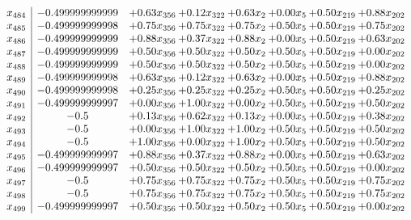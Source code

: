 \documentclass[8pt]{article}
\begin{document}
\[\begin{array}{c| c c@{\hskip 2pt} c@{\hskip 2pt} c@{\hskip 2pt} c@{\hskip 2pt} c@{\hskip 2pt} c@{\hskip 2pt} }
 x_{484}   &  -0.499999999999 & +  0.63 x_{356} & +  0.12 x_{322} & +  0.63 x_{2} & +  0.00 x_{5} & +  0.50 x_{219} & +  0.88 x_{202}\\
 x_{485}   &  -0.499999999998 & +  0.75 x_{356} & +  0.75 x_{322} & +  0.75 x_{2} & +  0.50 x_{5} & +  0.50 x_{219} & +  0.75 x_{202}\\
 x_{486}   &  -0.499999999999 & +  0.88 x_{356} & +  0.37 x_{322} & +  0.88 x_{2} & +  0.00 x_{5} & +  0.50 x_{219} & +  0.63 x_{202}\\
 x_{487}   &  -0.499999999999 & +  0.50 x_{356} & +  0.50 x_{322} & +  0.50 x_{2} & +  0.50 x_{5} & +  0.50 x_{219} & +  0.00 x_{202}\\
 x_{488}   &  -0.499999999999 & +  0.50 x_{356} & +  0.50 x_{322} & +  0.50 x_{2} & +  0.50 x_{5} & +  0.50 x_{219} & +  0.00 x_{202}\\
 x_{489}   &  -0.499999999998 & +  0.63 x_{356} & +  0.12 x_{322} & +  0.63 x_{2} & +  0.00 x_{5} & +  0.50 x_{219} & +  0.88 x_{202}\\
 x_{490}   &  -0.499999999998 & +  0.25 x_{356} & +  0.25 x_{322} & +  0.25 x_{2} & +  0.50 x_{5} & +  0.50 x_{219} & +  0.25 x_{202}\\
 x_{491}   &  -0.499999999997 & +  0.00 x_{356} & +  1.00 x_{322} & +  0.00 x_{2} & +  0.50 x_{5} & +  0.50 x_{219} & +  0.50 x_{202}\\
 x_{492}   &  -0.5 & +  0.13 x_{356} & +  0.62 x_{322} & +  0.13 x_{2} & +  0.00 x_{5} & +  0.50 x_{219} & +  0.38 x_{202}\\
 x_{493}   &  -0.5 & +  0.00 x_{356} & +  1.00 x_{322} & +  1.00 x_{2} & +  0.50 x_{5} & +  0.50 x_{219} & +  0.50 x_{202}\\
 x_{494}   &  -0.5 & +  1.00 x_{356} & +  0.00 x_{322} & +  1.00 x_{2} & +  0.50 x_{5} & +  0.50 x_{219} & +  0.50 x_{202}\\
 x_{495}   &  -0.499999999997 & +  0.88 x_{356} & +  0.37 x_{322} & +  0.88 x_{2} & +  0.00 x_{5} & +  0.50 x_{219} & +  0.63 x_{202}\\
 x_{496}   &  -0.499999999997 & +  0.50 x_{356} & +  0.50 x_{322} & +  0.50 x_{2} & +  0.50 x_{5} & +  0.50 x_{219} & +  0.00 x_{202}\\
 x_{497}   &  -0.5 & +  0.75 x_{356} & +  0.75 x_{322} & +  0.75 x_{2} & +  0.50 x_{5} & +  0.50 x_{219} & +  0.75 x_{202}\\
 x_{498}   &  -0.5 & +  0.75 x_{356} & +  0.75 x_{322} & +  0.75 x_{2} & +  0.50 x_{5} & +  0.50 x_{219} & +  0.75 x_{202}\\
 x_{499}   &  -0.499999999997 & +  0.50 x_{356} & +  0.50 x_{322} & +  0.50 x_{2} & +  0.50 x_{5} & +  0.50 x_{219} & +  0.00 x_{202}\\

\end{array}\]
\end{document}
